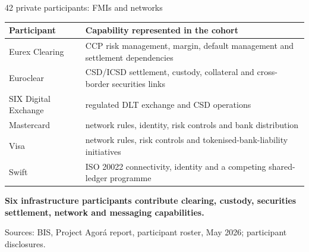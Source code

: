 \documentclass[aspectratio=169,12pt]{beamer}
\newcommand{\source}[1]{\vfill\par\fontsize{5.4}{6.5}\selectfont\color{Quiet}Sources: #1}
\begin{document}
\begin{frame}[shrink=12]{42 private participants: FMIs and networks}
  \fontsize{9.6}{11.5}\selectfont
  \begin{tabularx}{\textwidth}{L{3.0cm}Y}
    \toprule
    \textbf{Participant} & \textbf{Capability represented in the cohort} \\
    \midrule
    Eurex Clearing & CCP risk management, margin, default management and settlement dependencies \\
    Euroclear & CSD/ICSD settlement, custody, collateral and cross-border securities links \\
    SIX Digital Exchange & regulated DLT exchange and CSD operations \\
    Mastercard & network rules, identity, risk controls and bank distribution \\
    Visa & network rules, risk controls and tokenised-bank-liability initiatives \\
    Swift & ISO 20022 connectivity, identity and a competing shared-ledger programme \\
    \bottomrule
  \end{tabularx}
  \vspace{0.08cm}
  {\fontsize{8.8}{10.5}\selectfont\bfseries Six infrastructure participants contribute clearing, custody, securities settlement, network and messaging capabilities.\par}
  \source{BIS, Project Agor\'a report, participant roster, May 2026; participant disclosures.}
\end{frame}
\end{document}
